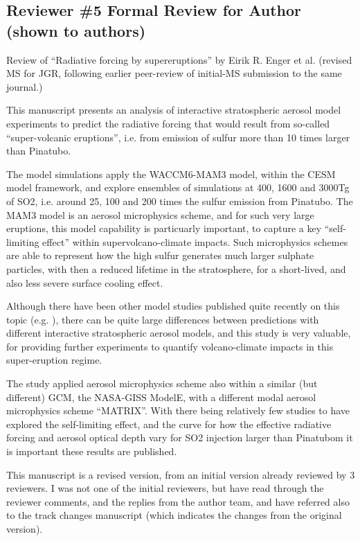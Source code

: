 \documentclass{reviewresponse}
\let\citeA\shortciteA %
\begin{document}
  \subsection*{Reviewer \#5 Formal Review for Author (shown to authors)}
  \begin{generalcomment}
    Review of ``Radiative forcing by supereruptions'' by Eirik R. Enger et al. (revised
    MS for JGR, following earlier peer-review of initial-MS submission to the same
    journal.)

    This manuscript presents an analysis of interactive stratospheric aerosol model
    experiments to predict the radiative forcing that would result from so-called
    ``super-volcanic eruptions'', i.e. from emission of sulfur more than 10 times larger
    than Pinatubo.

    The model simulations apply the WACCM6-MAM3 model, within the CESM model framework,
    and explore ensembles of simulations at 400, 1600 and 3000Tg of SO2, i.e. around 25,
    100 and 200 times the sulfur emission from Pinatubo. The MAM3 model is an aerosol
    microphysics scheme, and for such very large eruptions, this model capability is
    particuarly important, to capture a key ``self-limiting effect'' within
    supervolcano-climate impacts. Such microphysics schemes are able to represent how
    the high sulfur generates much larger sulphate particles, with then a reduced
    lifetime in the stratosphere, for a short-lived, and also less severe surface
    cooling effect.

    Although there have been other model studies published quite recently on this topic
    (e.g. \citeA{mcgraw2024}), there can be quite large differences between predictions
    with different interactive stratospheric aerosol models, and this study is very
    valuable, for providing further experiments to quantify volcano-climate impacts in
    this super-eruption regime.

    The \citeA{mcgraw2024} study applied aerosol microphysics scheme also within a
    similar (but different) GCM, the NASA-GISS ModelE, with a different modal aerosol
    microphysics scheme ``MATRIX''. With there being relatively few studies to have
    explored the self-limiting effect, and the curve for how the effective radiative
    forcing and aerosol optical depth vary for SO2 injection larger than Pinatubom it is
    important these results are published.

    This manuscript is a revised version, from an initial version already reviewed by 3
    reviewers. I was not one of the initial reviewers, but have read through the
    reviewer comments, and the replies from the author team, and have referred also to
    the track changes manuscript (which indicates the changes from the original
    version).


\end{generalcomment}
\end{document}
